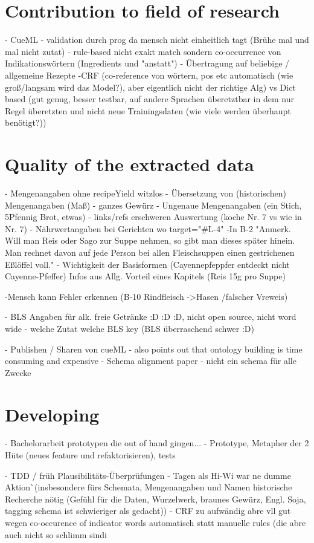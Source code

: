 \documentclass[12pt, twoside]{report}
\begin{document}
\section{Contribution to field of research}
- CueML
	- validation durch prog da mensch nicht einheitlich tagt (Brühe mal und mal nicht zutat)
- rule-based nicht exakt match sondern co-occurrence von Indikationswörtern (Ingredients und "anstatt")
- Übertragung auf beliebige / allgemeine Rezepte
-CRF (co-reference von wörtern, pos etc automatisch (wie groß/langsam wird das Model?), aber eigentlich nicht der richtige Alg) vs Dict based (gut genug, besser testbar, auf andere Sprachen überetztbar in dem nur Regel überetzten und nicht neue Trainingsdaten (wie viele werden überhaupt benötigt?))


\section{Quality of the extracted data}
- Mengenangaben ohne recipeYield witzlos
- Übersetzung von (historischen) Mengenangaben (Maß)
- ganzes Gewürz
- Ungenaue Mengenangaben (ein Stich, 5Pfennig Brot, etwas)
- links/refs erschweren Auswertung (koche Nr. 7 vs wie in Nr. 7)
- Nährwertangaben bei Gerichten wo target="#L-4"
-In B-2 "Anmerk. Will man Reis oder Sago zur Suppe nehmen, so gibt man dieses später
hinein. Man rechnet davon auf jede Person bei allen Fleischsuppen einen gestrichenen Eßlöffel voll."
- Wichtigkeit der Basisformen (Cayennepfeppfer entdeckt nicht Cayenne-Pfeffer)
Infos aus Allg. Vorteil eines Kapitels (Reis 15g pro Suppe)

-Mensch kann Fehler erkennen (B-10 Rindfleisch ->Hasen /falscher Vreweis)

- BLS Angaben für alk. freie Getränke :D :D :D, nicht open source, nicht word wide
- welche Zutat welche BLS key (BLS überraschend schwer :D)

- Publishen / Sharen von cueML
	- \parencite{GrammaBased} also points out that ontology building is time consuming and expensive
	- Schema alignment paper - nicht ein schema für alle Zwecke

\section{Developing}
- Bachelorarbeit prototypen die out of hand gingen...
- Prototype, Metapher der 2 Hüte (neues feature und refaktorisieren), tests

- TDD / früh Plausibilitäts-Überprüfungen - Tagen als Hi-Wi war ne dumme Aktion^^ (insbesondere fürs Schemata, Mengenangaben und Namen historische Recherche nötig (Gefühl für die Daten, Wurzelwerk, braunes Gewürz,	Engl. Soja, tagging schema ist schwieriger als gedacht))
- CRF zu aufwändig abre vll gut wegen co-occurence of indicator words automatisch statt manuelle rules (die abre auch nicht so schlimm sind^^)
\end{document}
